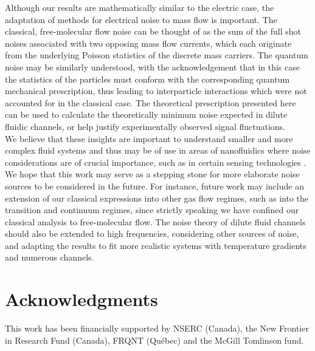 \documentclass[%
 reprint,
 aps,
 prb,
 epsf,
]{revtex4-2}
\begin{document}
    Although our results are mathematically similar to the electric case, the adaptation of methods for electrical noise to mass flow is important.  The classical, free-molecular flow noise can be thought of as the sum of the full shot noises associated with two opposing mass flow currents, which each originate from the underlying Poisson statistics of the discrete mass carriers. The quantum noise may be similarly understood, with the acknowledgement that in this case the statistics of the particles must conform with the corresponding quantum mechanical prescription, thus leading to interparticle interactions which were not accounted for in the classical case.  The theoretical prescription presented here can be used to calculate the theoretically minimum noise expected in dilute fluidic channels, or help justify experimentally observed signal fluctuations.\\
    
     We believe that these insights are important to understand smaller and more complex fluid systems and thus may be of use in areas of nanofluidics where noise considerations are of crucial importance, such as in certain sensing technologies \cite{nanopore noise}. We hope that this work may serve as a stepping stone for more elaborate noise sources to be considered in the future. For instance, future work may include an extension of our classical expressions into other gas flow regimes, such as into the transition and continuum regimes, since strictly speaking we have confined our classical analysis to free-molecular flow. The noise theory of dilute fluid channels should also be extended to high frequencies, considering other sources of noise, and adapting the results to fit more realistic systems with temperature gradients and numerous channels.

\section*{Acknowledgments}
   This work has been financially supported by NSERC (Canada), the New Frontier in Research Fund (Canada), FRQNT (Qu\'ebec) and the McGill Tomlinson fund.
\end{document}
